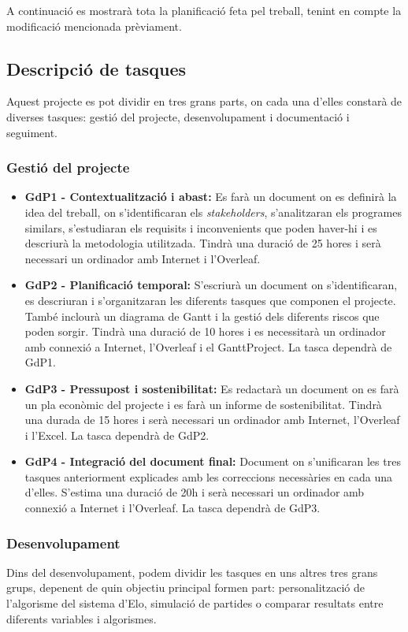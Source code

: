 \documentclass[a4paper]{article}
\begin{document}
A continuació es mostrarà tota la planificació feta pel treball, tenint en compte la modificació mencionada prèviament.

\subsection{Descripció de tasques}
Aquest projecte es pot dividir en tres grans parts, on cada una d'elles constarà de diverses tasques: gestió del projecte, desenvolupament i documentació i seguiment.
\subsubsection{Gestió del projecte}
\begin{itemize}
    \item \textbf{GdP1 - Contextualització i abast:} Es farà un document on es definirà la idea del treball, on s'identificaran els \textit{stakeholders}, s'analitzaran els programes similars, s'estudiaran els requisits i inconvenients que poden haver-hi i es descriurà la metodologia utilitzada. Tindrà una duració de 25 hores i serà necessari un ordinador amb Internet i l'Overleaf.
    \item \textbf{GdP2 - Planificació temporal:} S'escriurà un document on s'identificaran, es descriuran i s'organitzaran les diferents tasques que componen el projecte. També inclourà un diagrama de Gantt i la gestió dels diferents riscos que poden sorgir. Tindrà una duració de 10 hores i es necessitarà un ordinador amb connexió a Internet, l'Overleaf i el GanttProject. La tasca dependrà de GdP1.
    \item \textbf{GdP3 - Pressupost i sostenibilitat:} Es redactarà un document on es farà un pla econòmic del projecte i es farà un informe de sostenibilitat. Tindrà una durada de 15 hores i serà necessari un ordinador amb Internet, l'Overleaf i l'Excel. La tasca dependrà de GdP2.
    \item \textbf{GdP4 - Integració del document final:} Document on s'unificaran les tres tasques anteriorment explicades amb les correccions necessàries en cada una d'elles. S'estima una duració de 20h i serà necessari un ordinador amb connexió a Internet i l'Overleaf. La tasca dependrà de GdP3.
\end{itemize}

\subsubsection{Desenvolupament}
Dins del desenvolupament, podem dividir les tasques en uns altres tres grans grups, depenent de quin objectiu principal formen part: personalització de l’algorisme del sistema d’Elo, simulació de partides o comparar resultats entre diferents variables i algorismes.
\end{document}
